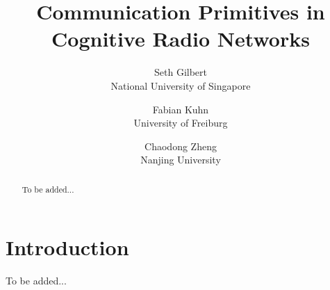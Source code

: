 \documentclass[11pt, letterpaper, onecolumn, oneside, final]{article}
\begin{document}

\title{
	{\bf\centering Communication Primitives in Cognitive Radio Networks}
}
\author{
	Seth Gilbert \\
	\small National University of Singapore \\
	\and
	Fabian Kuhn \\
	\small University of Freiburg \\
	\and
	Chaodong Zheng \\
	\small Nanjing University \\
}
\date{%
}
\maketitle
\thispagestyle{empty}

\begin{abstract}
To be added...
\end{abstract}

\clearpage
\pagestyle{plain}
\setcounter{page}{1}


\section{Introduction}

To be added...
\end{document}
